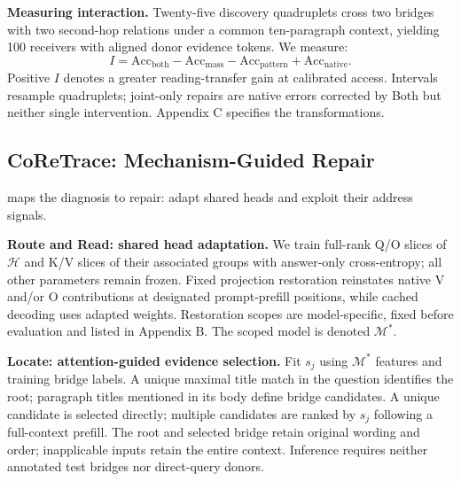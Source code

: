 \textbf{Measuring interaction.} Twenty-five discovery quadruplets cross two bridges with two second-hop relations under a common ten-paragraph context, yielding 100 receivers with aligned donor evidence tokens. We measure:
\begin{equation}I=\mathrm{Acc}_{\mathrm{both}}-\mathrm{Acc}_{\mathrm{mass}}-\mathrm{Acc}_{\mathrm{pattern}}+\mathrm{Acc}_{\mathrm{native}}.\label{eq:interaction}\end{equation}
Positive $I$ denotes a greater reading-transfer gain at calibrated access. Intervals resample quadruplets; joint-only repairs are native errors corrected by Both but neither single intervention. Appendix C specifies the transformations.


\subsection{CoReTrace: Mechanism-Guided Repair}\label{sec:repair}
 maps the diagnosis to repair: adapt shared heads and exploit their address signals.

\textbf{Route and Read: shared head adaptation.} We train full-rank Q/O slices of $\mathcal{H}$ and K/V slices of their associated groups with answer-only cross-entropy; all other parameters remain frozen. Fixed projection restoration reinstates native V and/or O contributions at designated prompt-prefill positions, while cached decoding uses adapted weights. Restoration scopes are model-specific, fixed before evaluation and listed in Appendix B. The scoped model is denoted $\mathcal{M}^*$.

\textbf{Locate: attention-guided evidence selection.} Fit $s_j$ using $\mathcal{M}^*$ features and training bridge labels. A unique maximal title match in the question identifies the root; paragraph titles mentioned in its body define bridge candidates. A unique candidate is selected directly; multiple candidates are ranked by $s_j$ following a full-context prefill. The root and selected bridge retain original wording and order; inapplicable inputs retain the entire context. Inference requires neither annotated test bridges nor direct-query donors.
